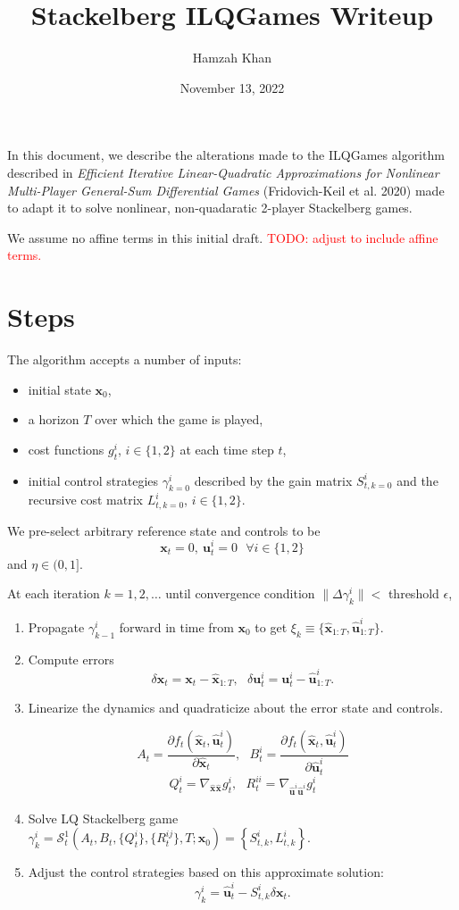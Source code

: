 \documentclass[11pt]{article}
\title{Stackelberg ILQGames Writeup}
\author{Hamzah Khan} \date{November 13, 2022}
\newcommand\dd[2]{\frac{\partial#1}{\partial#2}}
\newcommand\truestate[1]{\bm{x}_{#1}}
\newcommand\stack[2]{\mathcal{S}^{#1}_{#2}}
\newcommand\ctrl[2]{\bm{u}^{#1}_{#2}}
\newcommand\horizon{T}
\newcommand\stackmeas[2]{\bm{\hat{x}}^{#1}_{#2}}
\newcommand\ctrlhat[2]{\bm{\hat{u}}^{#1}_{#2}}
\newcommand\todo[1]{\textcolor{red}{TODO: #1}}
\begin{document}
\maketitle

In this document, we describe the alterations made to the ILQGames algorithm described in \emph{Efficient Iterative Linear-Quadratic Approximations for Nonlinear Multi-Player General-Sum Differential Games} (Fridovich-Keil et al. 2020) made to adapt it to solve nonlinear, non-quadaratic 2-player Stackelberg games.

We assume no affine terms in this initial draft. \todo{adjust to include affine terms.}

\section{Steps}
The algorithm accepts a number of inputs:
\begin{itemize}
\item initial state $\truestate{0}$,
\item a horizon $\horizon$ over which the game is played,
\item cost functions $g^i_t$, $i \in \{1, 2\}$ at each time step $t$,
\item initial control strategies $\gamma^i_{k=0}$ described by the gain matrix $S^i_{t, k=0}$ and the recursive cost matrix $L^i_{t, k=0}$, $i \in \{1, 2\}$.
\end{itemize}

We pre-select arbitrary reference state and controls to be
\[ \truestate{t} = 0, ~ \ctrl{i}{t} = 0 ~~~ \forall i \in \{ 1, 2 \} \]
and $\eta \in (0, 1]$.

At each iteration $k = 1, 2, \ldots$ until convergence condition $\| \Delta \gamma^i_{k} \| < $ threshold $\epsilon$,
\begin{enumerate}
\item Propagate $\gamma^i_{k-1}$ forward in time from $\truestate{0}$ to get $\xi_k \equiv \{ \stackmeas{}{1:\horizon}, \ctrlhat{i}{1:\horizon} \}$.

\item Compute errors
\[ \delta \truestate{t} = \truestate{t} - \stackmeas{}{1:\horizon}, ~~~ \delta \ctrl{i}{t} = \ctrl{i}{t} -  \ctrlhat{i}{1:\horizon}. \]

\item Linearize the dynamics and quadraticize about the error state and controls.

\[ A_t = \dd{f_t(\stackmeas{}{t}, \ctrlhat{i}{t})}{\stackmeas{}{t}}, ~~~ B^i_t = \dd{f_t(\stackmeas{}{t}, \ctrlhat{i}{t})}{\ctrlhat{i}{t}} \]
\[ Q^i_t = \nabla_{\stackmeas{}{}\stackmeas{}{}} g^i_t, ~~~ R^{ii}_t = \nabla_{\ctrlhat{i}{}\ctrlhat{i}{}} g^i_t \]

\item Solve LQ Stackelberg game $\gamma^i_{k} = \stack{1}{t}(A_t, B_t, \{ Q^i_t \}, \{ R^{ij}_t \}, \horizon; \truestate{0}) = \left\{ S^i_{t, k}, L^i_{t, k} \right\}$.

\item Adjust the control strategies based on this approximate solution:
\[ \gamma^i_k = \ctrlhat{i}{t} - S^i_{t, k} \delta\truestate{t}.  \]
\end{enumerate}
\end{document}
